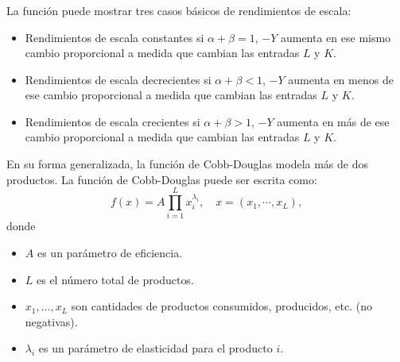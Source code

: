 \begin{frame}
\frametitle{\secname}

La función puede mostrar tres casos básicos de rendimientos de escala:
\begin{itemize}
	\item Rendimientos de escala constantes si $\alpha+\beta=1$, $-Y$ aumenta en ese mismo cambio proporcional a medida que cambian las entradas $L$ y $K$.
	\item Rendimientos de escala decrecientes si $\alpha+\beta<1$, $-Y$ aumenta en menos de ese cambio proporcional a medida que cambian las entradas $L$ y $K$.
	\item Rendimientos de escala crecientes si $\alpha+\beta>1$, $-Y$ aumenta en más de ese cambio proporcional a medida que cambian las entradas $L$ y $K$.
\end{itemize}

En su forma generalizada, la función de Cobb-Douglas modela más de dos productos. La función de Cobb-Douglas puede ser escrita como:
\begin{equation}
f\left(x\right)=A\prod_{i=1}^{L}x_{i}^{\lambda_{i}},\quad x=\left(x_{1},\cdots,x_{L} \right),
\end{equation}
donde
\begin{itemize}
	\item $A$ es un parámetro de eficiencia.
	\item $L$ es el número total de productos.
	\item $x_{1},\ldots,x_{L}$ son cantidades de productos consumidos, producidos, etc. (no negativas).
	\item $\lambda_{i}$ es un parámetro de elasticidad para el producto $i$.
\end{itemize}
\end{frame}